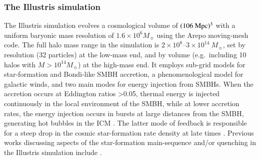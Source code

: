 \documentclass[preprint2,tighten]{aastex62}
\begin{document}
\subsubsection{The Illustris simulation}
The Illustris simulation \citep{Vogelsbergeretal2014, Geneletal2014} evolves a cosmological volume of $(106\ \rm{Mpc})^3$ with a uniform baryonic mass resolution of $1.6\times10^6M_{\sun}$ using the Arepo moving-mesh code. The full halo mass range in the simulation is $2 \times 10^8$--$3\times 10^{14}\ M_{\sun}$, set by resolution (32 particles) at the low-mass end, and by volume (e.g.~including 10 halos with $M>10^{14}M_{\sun}$) at the high-mass end. It employs sub-grid models \citep{Vogelsbergeretal2013} for star-formation \citep{SpringelHernquist2003} and Bondi-like SMBH accretion, a phenomenological model for galactic winds, and two main modes for energy injection from SMBHs. When the accretion occurs at Eddington ratios >0.05, thermal energy is injected continuously in the local environment of the SMBH, while at lower accretion rates, the energy injection occurs in bursts at large distances from the SMBH, generating hot bubbles in the ICM \citep{Sijackietal2007}. The latter mode of feedback is responsible for a steep drop in the cosmic star-formation rate density at late times \citep{Vogelsbergeretal2013}. Previous works discussing aspects of the star-formation main-sequence and/or quenching in the Illustris simulation include \citet{Vogelsbergeretal2014, Sparreetal2015, Blucketal2016, Terrazasetal2017}.
\end{document}
